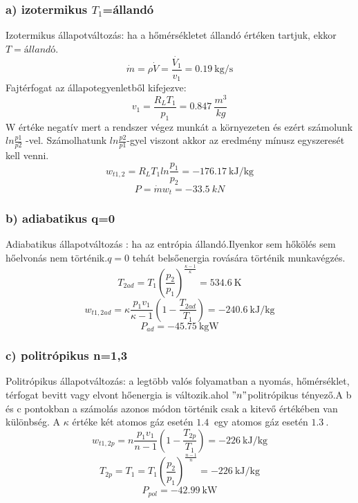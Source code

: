 \subsubsection{a) izotermikus $T_1$=állandó}
Izotermikus állapotváltozás: ha a hőmérsékletet állandó értéken tartjuk, ekkor $T=állandó$.
\begin{equation}
\dot{m}=\rho \dot{V}=\frac{\dot{V_1}}{v_1}=\SI{0,19}{\kilogram\per\second}
\end{equation}
Fajtérfogat az állapotegyenletből kifejezve:
\begin{equation}
v_1=\frac{R_L T_1}{p_1}=\SI{0,847}{\frac{m^3}{kg}}
\end{equation}
W értéke negatív mert a rendszer végez munkát a környezeten és ezért számolunk $ln\frac{p1}{p2}$ -vel. Számolhatunk $ln\frac{p2}{p1}$-gyel viszont akkor az eredmény mínusz egyszeresét kell venni.
\begin{equation}
w_{t1,2}=R_LT_1ln\frac{p_1}{p_2}=\SI{-176,17}{\kilo\joule\per\kilogram}
\end{equation}
\begin{equation}
P=\dot{m}w_t=\SI{-33,5}{kN}
\end{equation}

\subsubsection{b) adiabatikus q=0}
Adiabatikus állapotváltozás : ha az entrópia állandó.Ilyenkor sem hőkölés sem hőelvonás nem történik.$q=0$ tehát belsőenergia rovására történik munkavégzés.
\begin{equation}
T_{2ad}=T_1\left(\frac{p_2}{p_1}\right)^\frac{\kappa-1}{\kappa}=\SI{534,6}{\kelvin}
\end{equation}
\begin{equation}
w_{t1,2ad}=\kappa\frac{p_1v_1}{\kappa-1}\left(1-\frac{T_{2ad}}{T_1}\right)=\SI{-240,6}{\kilo\joule\per\kilogram}
\end{equation}
\begin{equation}
P_{ad}=\SI{-45,75}{\kilogram\watt}
\end{equation}

\subsubsection{c) politrópikus n=1,3}
Politrópikus állapotváltozás: a legtöbb valós folyamatban a nyomás, hőmérséklet, térfogat bevitt vagy elvont hőenergia is változik.ahol $"n"$politrópikus tényező.A b és c pontokban a számolás azonos módon történik csak a kitevő értékében van különbség.
A $\kappa$ értéke két atomos gáz esetén $\SI{1,4}{}$ egy atomos gáz esetén $\SI{1,3}{}$.
\begin{equation}
w_{t1,2p}=n\frac{p_1v_1}{n-1}\left(1-\frac{T_{2p}}{T_1}\right)=\SI{-226}{\kilo\joule\per\kilogram}
\end{equation}
\begin{equation}
T_{2p}=T_1=T_1\left(\frac{p_2}{p_1}\right)^\frac{n-1}{n}=\SI{-226}{\kilo\joule\per\kilogram}
\end{equation}
\begin{equation}
P_{pol}=\SI{-42,99}{\kilo\watt}
\end{equation}
